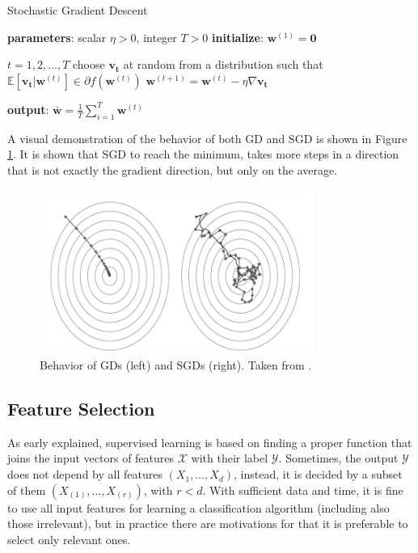 \begin{algorithm}
	\caption{Stochastic Gradient Descent}\label{alg:SGD}
	\begin{algorithmic}[1]
		\State \textbf{parameters}: scalar $\eta > 0$, integer $T>0$
		\State \textbf{initialize}: $\mathbf{w}^{(1)} = \mathbf{0}$
		
		\For $t = 1, 2, \dots , T$
		\State choose $\mathbf{v_t}$ at random from a distribution such that $\mathbb{E}[\mathbf{v_t} | \mathbf{w}^{(t)}] \in \partial f(\mathbf{w}^{(t)})$
		\State $\mathbf{w}^{(t+1)} = \mathbf{w}^{(t)} - \eta \nabla \mathbf{v_t}$
		\EndFor
		
		\State \textbf{output}: $\mathbf{\bar{w}} = \frac{1}{T} \sum_{i=1}^{T} \mathbf{w}^{(t)}$
	\end{algorithmic}
\end{algorithm}

A visual demonstration of the behavior of both \ac{GD} and \ac{SGD} is shown in Figure \ref{fig:gd-sgd}. It is shown that \ac{SGD} to reach the minimum, takes more steps in a direction that is not exactly the gradient direction, but only on the average.


\begin{figure}[ht]
	\centering
	\includegraphics[width=0.8\textwidth]{figures/gd-sgd.png}
	\caption{Behavior of \aclp{GD} (left) and \aclp{SGD} (right). Taken from \cite{phdthesis}.}
	\label{fig:gd-sgd}
\end{figure}


\subsection{Feature Selection}

As early explained, supervised learning is based on finding a proper function that joins the input vectors of features $\mathcal{X}$ with their label $\mathcal{Y}$. Sometimes, the output $\mathcal{Y}$ does not depend by all features $(X_1, \dots, X_d)$, instead, it is decided by a subset of them $(X_{(1)}, \dots, X_{(r)})$, with $r<d$. With sufficient data and time, it is fine to use all input features for learning a classification algorithm (including also those irrelevant), but in practice there are motivations for that it is preferable to select only relevant ones.\\

